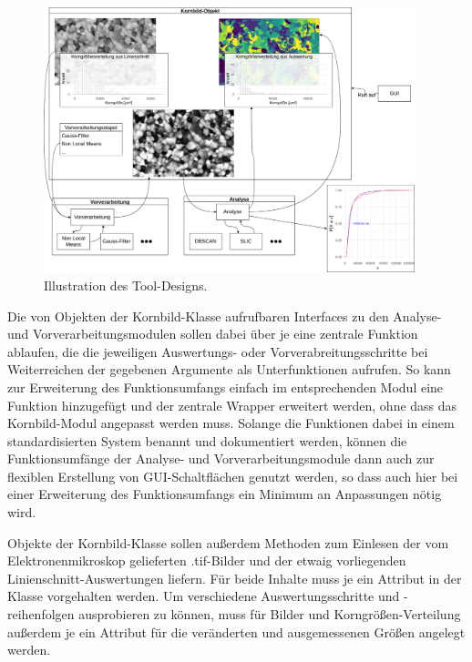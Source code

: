 \documentclass[
  12pt,
]{book}
\begin{document}
\begin{figure}

{\centering \includegraphics[width=0.96\textwidth]{../imgs/design} 

}

\caption[Illustration des Tool-Designs.]{Illustration des Tool-Designs.}\label{fig:designGraph}
\end{figure}

Die von Objekten der Kornbild-Klasse aufrufbaren Interfaces zu den Analyse- und Vorverarbeitungsmodulen sollen dabei über je eine zentrale Funktion ablaufen, die die jeweiligen Auswertungs- oder Vorverabreitungsschritte bei Weiterreichen der gegebenen Argumente als Unterfunktionen aufrufen. So kann zur Erweiterung des Funktionsumfangs einfach im entsprechenden Modul eine Funktion hinzugefügt und der zentrale Wrapper erweitert werden, ohne dass das Kornbild-Modul angepasst werden muss. Solange die Funktionen dabei in einem standardisierten System benannt und dokumentiert werden, können die Funktionsumfänge der Analyse- und Vorverarbeitungsmodule dann auch zur flexiblen Erstellung von GUI-Schaltflächen genutzt werden, so dass auch hier bei einer Erweiterung des Funktionsumfangs ein Minimum an Anpassungen nötig wird.

Objekte der Kornbild-Klasse sollen außerdem Methoden zum Einlesen der vom Elektronenmikroskop gelieferten .tif-Bilder und der etwaig vorliegenden Linienschnitt-Auswertungen liefern. Für beide Inhalte muss je ein Attribut in der Klasse vorgehalten werden. Um verschiedene Auswertungsschritte und -reihenfolgen ausprobieren zu können, muss für Bilder und Korngrößen-Verteilung außerdem je ein Attribut für die veränderten und ausgemessenen Größen angelegt werden.
\end{document}
